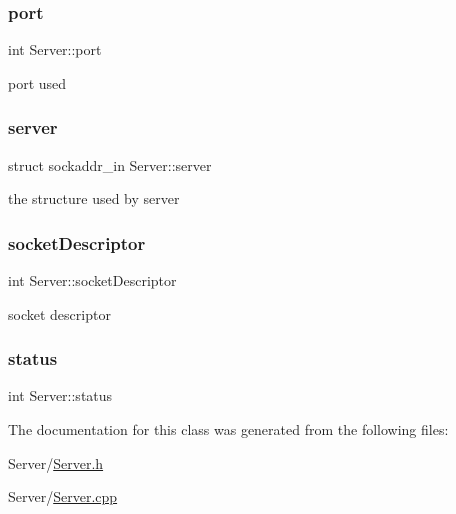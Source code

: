 \subsubsection{\texorpdfstring{port}{port}}
{\footnotesize\ttfamily int Server\+::port\hspace{0.3cm}{\ttfamily [private]}}

port used \mbox{\label{classServer_af10e93ccde1ccedd999726519b628f68}} 
\subsubsection{\texorpdfstring{server}{server}}
{\footnotesize\ttfamily struct sockaddr\+\_\+in Server\+::server\hspace{0.3cm}{\ttfamily [private]}}

the structure used by server \mbox{\label{classServer_a5e52b598760882795a7ea0aada7cb9b7}} 
\subsubsection{\texorpdfstring{socket\+Descriptor}{socketDescriptor}}
{\footnotesize\ttfamily int Server\+::socket\+Descriptor\hspace{0.3cm}{\ttfamily [private]}}

socket descriptor \mbox{\label{classServer_a4073381c056bef47db16d0472c4b31a9}} 
\subsubsection{\texorpdfstring{status}{status}}
{\footnotesize\ttfamily int Server\+::status\hspace{0.3cm}{\ttfamily [private]}}



The documentation for this class was generated from the following files\+:\begin{DoxyCompactItemize}
\item 
Server/\mbox{\hyperlink{Server_8h}{Server.\+h}}\item 
Server/\mbox{\hyperlink{Server_8cpp}{Server.\+cpp}}\end{DoxyCompactItemize}
